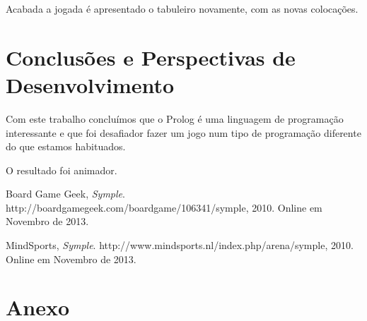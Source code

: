 \documentclass[a4paper]{article}
\begin{document}
Acabada a jogada é apresentado o tabuleiro novamente, com as novas colocações.


\section{Conclusões e Perspectivas de Desenvolvimento}
Com este trabalho concluímos que o Prolog é uma linguagem de programação interessante e que foi desafiador fazer um jogo num tipo de programação diferente do que estamos habituados.

O resultado foi animador.


\clearpage
{}
\renewcommand\refname{Bibliografia}

\begin{thebibliography}{9}

  Board Game Geek,
  \emph{Symple}.
  http://boardgamegeek.com/boardgame/106341/symple,
  2010. Online em Novembro de 2013.
  
  MindSports,
  \emph{Symple}.
  http://www.mindsports.nl/index.php/arena/symple,
  2010. Online em Novembro de 2013.

\end{thebibliography}

\newpage
\appendix
\section{Anexo}





\end{document}
